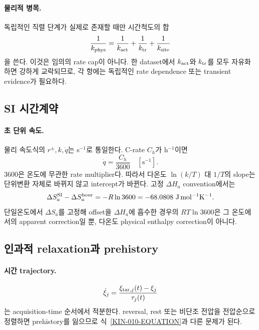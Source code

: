 \paragraph{ 물리적 병목.}
독립적인 직렬 단계가 실제로 존재할 때만 시간척도의 합
\[
\frac1{k_{\rm phys}}
=\frac1{k_{\rm act}}+\frac1{k_{\rm tr}}+\frac1{k_{\rm site}}
\]
을 쓴다. 이것은 임의의 rate cap이 아니다. 한 dataset에서
$k_{\rm act}$와 $k_{\rm tr}$를 모두 자유화하면 강하게 교락되므로,
각 항에는 독립적인 rate dependence 또는 transient evidence가
필요하다.

\subsection{SI 시간계약}\label{KIN-CH3-UNITS}

\paragraph{ 초 단위 속도.}
물리 속도식의 $r^\pm,k,\dot q$는 s$^{-1}$로 통일한다. C-rate
$C_h$가 h$^{-1}$이면
\[
\dot q=\frac{C_h}{3600}\quad[\mathrm{s^{-1}}].
\]
3600은 온도에 무관한 rate multiplier다. 따라서 다온도
$\ln(k/T)$ 대 $1/T$의 slope는 단위변환 자체로 바뀌지 않고
intercept가 바뀐다. 고정 $\Delta H_a$ convention에서는
\begin{equation}
\Delta S_a^{\rm SI}-\Delta S_a^{\rm hour}
=-R\ln3600=-68.0808\ {\rm J\,mol^{-1}K^{-1}}.
\label{KIN-009-EQUATION}
\end{equation}
단일온도에서 $\Delta S_a$를 고정해 offset을 $\Delta H_a$에
흡수한 경우의 $RT\ln3600$은 그 온도에서의 apparent correction일
뿐, 다온도 physical enthalpy correction이 아니다.

\subsection{인과적 relaxation과 prehistory}\label{KIN-CH3-MEMORY}

\paragraph{ 시간 trajectory.}
\begin{equation}
\dot\xi_j=\frac{\xi_{\mathrm{tar},j}(t)-\xi_j}{\tau_j(t)}
\label{KIN-010-EQUATION}
\end{equation}
는 acquisition-time 순서에서 적분한다. reversal, rest 또는
비단조 전압을 전압순으로 정렬하면 prehistory를 잃으므로
식~\eqref{KIN-010-EQUATION}과 다른 문제가 된다.

